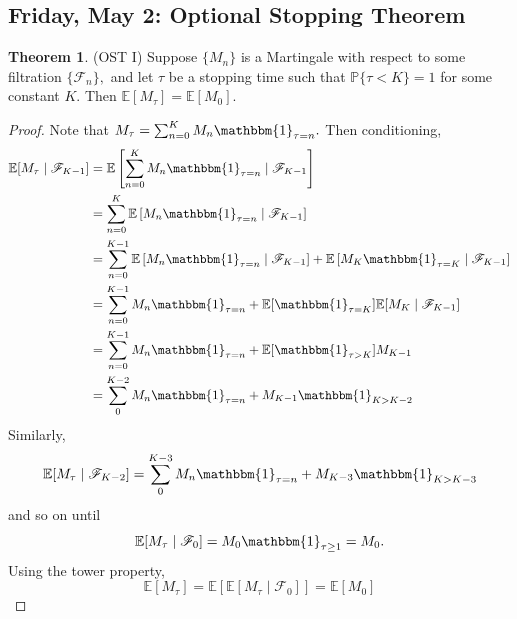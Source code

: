\documentclass[10pt, oneside]{article}
\newcommand{\bbP}{\mathbb{P}}
\newcommand{\bbE}{\mathbb{E}}
\theoremstyle{definition}
\newtheorem{thm}{Theorem}
\begin{document}
\subsection{Friday, May 2: Optional Stopping Theorem}
\begin{thm}
(OST I)
    Suppose $\{M_n\}$ is a Martingale with respect to some filtration $\{\mathcal{F}_n\},$ and let $\tau$ be a stopping time such that $\bbP\{\tau < K\} = 1$ for some constant $K.$ Then $\bbE[M_\tau] = \bbE[M_0].$
\end{thm}
\begin{proof}
    Note that $M_\tau = \sum_{n=0}^K M_n \mathbbm{1}_{\tau = n}.$ Then conditioning,
    \begin{align*}
        \bbE[M_\tau \mid \mathcal{F}_{K-1}] &= \bbE\left[\sum_{n=0}^K M_n \mathbbm{1}_{\tau = n} \mid \mathcal{F}_{K-1}\right]\\
        &= \sum_{n=0}^K \bbE\left[M_n \mathbbm{1}_{\tau = n}\mid \mathcal{F}_{K-1}\right]\\
        &= \sum_{n=0}^{K-1}\bbE\left[M_n \mathbbm{1}_{\tau = n}\mid \mathcal{F}_{K-1}\right] + \bbE\left[M_K \mathbbm{1}_{\tau = K}\mid \mathcal{F}_{K-1}\right]\\
        &= \sum_{n=0}^{K-1}M_n \mathbbm{1}_{\tau = n} + \bbE[\mathbbm{1}_{\tau = K}] \bbE[M_K \mid \mathcal{F}_{K-1}]\\
        &= \sum_{n=0}^{K-1}M_n \mathbbm{1}_{\tau = n} + \bbE[\mathbbm{1}_{\tau > K}] M_{K-1}\\
        &= \sum_{0}^{K-2}M_n \mathbbm{1}_{\tau = n} + M_{K-1}\mathbbm{1}_{K >K-2}
    \end{align*}
    Similarly, 
    \[\bbE[M_\tau \mid \mathcal{F}_{K-2}] = \sum_{0}^{K-3}M_n \mathbbm{1}_{\tau = n} + M_{K-3}\mathbbm{1}_{K >K-3}\] and so on until 
    \[\bbE[M_\tau \mid \mathcal{F}_0] = M_0\mathbbm{1}_{\tau \geq 1} = M_0.\] Using the tower property, 
    \[\bbE[M_\tau] = \bbE[\bbE[M_\tau \mid \mathcal{F}_0]] = \bbE[M_0]\]
\end{proof}
\end{document}
